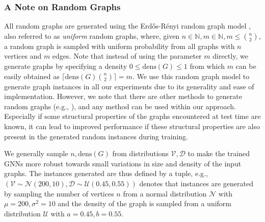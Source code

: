 \documentclass[draft,final]{vutinfth} %
\begin{document}
\subsubsection{A Note on Random Graphs}
All random graphs are generated using the Erd\H{o}s-Rényi random graph model \cite{erdos59a}, also referred to as \emph{uniform} random graphs, where, given $n \in \mathbb{N}, m \in \mathbb{N}, m \leq \binom{n}{2}$, a random graph is sampled with uniform probability from all graphs with $n$ vertices and $m$ edges. Note that instead of using the parameter $m$ directly, we generate graphs by specifying a density $0 \leq \mathrm{dens}(G) \leq 1$ from which $m$ can be easily obtained as $\lceil \mathrm{dens}(G) \binom{n}{2} \rceil = m$. 
We use this random graph model to generate graph instances in all our experiments due to its generality and ease of implementation. 
However, we note that there are other methods to generate random graphs (e.g., \cite{Aiello2001}), and any method can be used within our approach. Especially if some structural properties of the graphs encountered at test time are known, it can lead to improved performance if these structural properties are also present in the generated random instances during training. 

We generally sample $n, \mathrm{dens}(G)$ from distributions $\mathcal{V}, \mathcal{D}$ to make the trained GNNs more robust towards small variations in size and density of the input graphs. The instances generated are thus defined by a tuple, e.g., $(\mathcal{V} \sim \mathcal{N}(200, 10), \mathcal{D} \sim \mathcal{U}(0.45, 0.55))$ denotes that instances are generated by sampling the number of vertices $n$ from a normal distribution $\mathcal{N}$ with $\mu=200, \sigma^2 = 10$ and the density of the graph is sampled from a uniform distribution $\mathcal{U}$ with $a=0.45, b=0.55$. 
\end{document}

